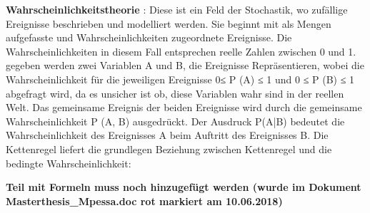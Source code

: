 \begin{itemize}
\textbf{Wahrscheinlichkeitstheorie} \cite{MRS08}: Diese ist ein Feld der Stochastik, wo zufällige Ereignisse beschrieben und modelliert werden. Sie beginnt mit als Mengen aufgefasste und Wahrscheinlichkeiten zugeordnete Ereignisse. Die Wahrscheinlichkeiten in diesem Fall entsprechen reelle Zahlen zwischen 0 und 1. gegeben werden zwei Variablen A und B, die Ereignisse Repräsentieren, wobei die Wahrscheinlichkeit für die jeweiligen Ereignisse 0≤ P (A) ≤ 1 und  0 ≤ P (B) ≤ 1 abgefragt wird, da es unsicher ist ob, diese Variablen wahr sind in der reellen Welt. Das gemeinsame Ereignis der beiden Ereignisse wird durch die gemeinsame Wahrscheinlichkeit P (A, B) ausgedrückt. Der Ausdruck P(A|B) bedeutet die Wahrscheinlichkeit des Ereignisses A beim Auftritt des Ereignisses B. Die Kettenregel liefert die grundlegen Beziehung zwischen Kettenregel und die bedingte Wahrscheinlichkeit: 

\textbf{Teil mit Formeln muss noch hinzugefügt werden (wurde im Dokument Masterthesis\_Mpessa.doc 
	rot markiert am 10.06.2018)} 


\end{itemize}
